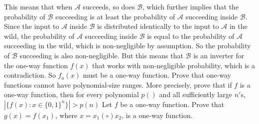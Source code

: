\documentclass[10pt]{exam}
\begin{document}
\begin{questions}
This means that when $\mathcal{A}$ succeeds, so does $\mathcal{B}$, which further implies that the probability of $\mathcal{B}$
succeeding is at least the probability of $\mathcal{A}$ succeeding inside $\mathcal{B}$. Since the input to $\mathcal{A}$ inside $\mathcal{B}$ is
distributed identically to the input to $\mathcal{A}$ in the wild, the probability of $\mathcal{A}$ succeeding inside $\mathcal{B}$ is
equal to the probability of $\mathcal{A}$ succeeding in the wild, which is non-negligible by assumption. So
the probability of $\mathcal{B}$ succeeding is also non-negligible. But this means that $\mathcal{B}$ is an inverter for
the one-way function $f(x)$ that works with non-negligible probability, which is a contradiction. So $f_a(x)$ must be a one-way function.
\question[3] Prove that one-way functions cannot have polynomial-size ranges. More precisely, prove that if $f$ is a one-way function, then for every polynomial $p()$ and all sufficiently large $n'$s, $|\{f(x):x\in \{0,1\}^n\}|>p(n)$
\question[3] Let $f$ be a one-way function. Prove that $g(x)=f(x_1)$, where $x=x_1(\circ)x_2$, is a one-way function.

\end{questions}
\end{document}
